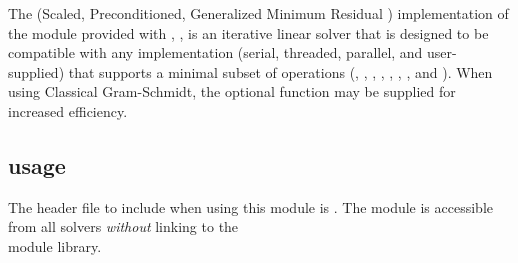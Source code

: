 
The {\spgmr} (Scaled, Preconditioned, Generalized Minimum
Residual \cite{SaSc:86}) implementation of the {\sunlinsol} module
provided with {\sundials}, {\sunlinsolspgmr}, is an iterative linear
solver that is designed to be compatible with any {\nvector}
implementation (serial, threaded, parallel, and user-supplied) that
supports a minimal subset of operations (, 
, , , ,
, , and ).  When using
Classical Gram-Schmidt, the optional function 
may be supplied for increased efficiency.

\subsection{{\sunlinsolspgmr} usage}\label{ss:sunlinsol_spgmr_usage}

The header file to include when using this module 
is . The {\sunlinsolspgmr} module
is accessible from all {\sundials} solvers \textit{without}
linking to the \\ \noindent
{} module library.


